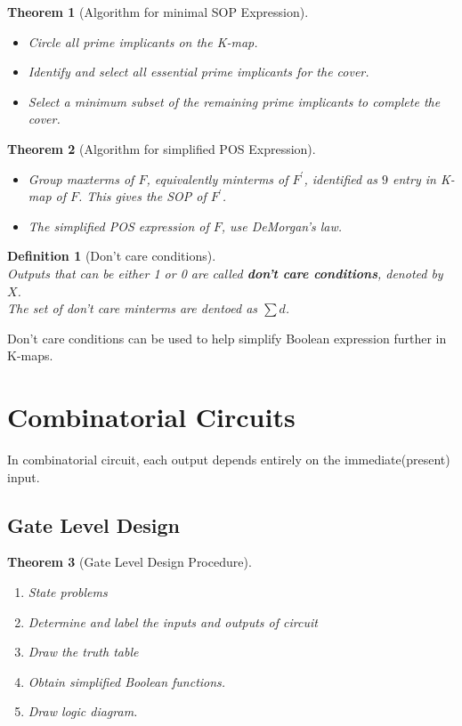 \documentclass[12pt]{article}
\newtheorem{definition}{Definition}[section]
\newtheorem{theorem}{Theorem}[section]
\theoremstyle{definition}
\begin{document}
\begin{theorem}[Algorithm for minimal SOP Expression]
\hfill\\\normalfont \begin{itemize}
\item Circle all prime implicants on the K-map.
\item Identify and select all essential prime implicants for the cover.
\item Select a minimum subset of the remaining prime implicants to complete the cover.\end{itemize}
\end{theorem}
\begin{theorem}[Algorithm for simplified POS Expression]
\hfill\\\normalfont \begin{itemize}
\item Group maxterms of $F$, equivalently minterms of $F^\prime$, identified as $9$ entry in K-map of $F$. This gives the SOP of $F^\prime$.\\
\item The simplified POS expression of $F$, use DeMorgan's law.
\end{itemize}
\end{theorem}
\begin{definition}[Don't care conditions]
\hfill\\\normalfont Outputs that can be either 1 or 0 are called \textbf{don't care conditions}, denoted by $X$.\\The set of don't care minterms are dentoed as $\sum d$.
\end{definition}
Don't care conditions can be used to help simplify Boolean expression further in K-maps.
\clearpage
\section{Combinatorial Circuits}
In combinatorial circuit, each output depends entirely on the immediate(present) input.
\subsection{Gate Level Design}
\begin{theorem}[Gate Level Design Procedure]
\begin{enumerate}
  \item State problems
  \item Determine and label the inputs and outputs of circuit
  \item Draw the truth table
  \item Obtain simplified Boolean functions.
  \item Draw logic diagram.
\end{enumerate} 
\end{theorem}
\end{document}
